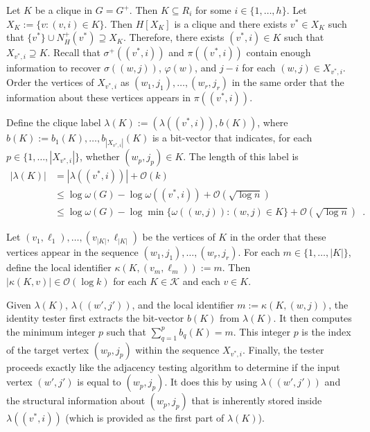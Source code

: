\documentclass{patmorin}
\renewcommand{\le}{\leqslant}
\newcommand{\Oh}{\mathcal{O}}
\begin{document}
  Let $K$ be a clique in $G=G^+$.  Then $K\subseteq R_i$ for some $i\in\{1,\ldots,h\}$.  Let $X_K:=\{v: (v,i)\in K\}$.
  Then $H[X_K]$ is a clique and there exists $v^*\in X_K$ such that $\{v^*\}\cup N^+_H(v^*)\supseteq X_K$.
  Therefore, there exists $(v^*,i)\in K$ such that $X_{v^*,i}\supseteq K$. Recall that $\sigma^+((v^*,i))$ and $\pi((v^*,i))$ contain enough information to recover $\sigma((w,j))$, $\varphi(w)$, and $j-i$ for each $(w,j)\in X_{v^*,i}$.
  Order the vertices of $X_{v^*,i}$ as $(w_1,j_1),\ldots,(w_{r},j_r)$ in the same order that the information about these vertices appears in $\pi((v^*,i))$.

  Define the clique label $\lambda(K):=(\lambda((v^*,i)), b(K))$, where $b(K):=b_1(K),\ldots,b_{|X_{v^*,i}|}(K)$ is a bit-vector that indicates, for each $p\in\{1,\ldots,|X_{v^*,i}|\}$, whether $(w_p,j_p)\in K$.
  The length of this label is
  \begin{align*}
     |\lambda(K)|
     & = |\lambda((v^*,i))| + \Oh(k) \\
     & \le \log\omega(G) - \log\omega((v^*,i)) + \Oh(\sqrt{\log n}) \\
     & \le \log\omega(G) - \log\min\{\omega((w,j)):(w,j)\in K\} + \Oh(\sqrt{\log n})  \enspace .
  \end{align*}

  Let $(v_1,\ell_1),\ldots,(v_{|K|},\ell_{|K|})$ be the vertices of $K$ in the order that these vertices appear in the sequence $(w_1,j_1),\ldots,(w_{r},j_r)$.
  For each $m\in\{1,\ldots,|K|\}$, define the local identifier $\kappa(K,(v_m,\ell_m)):= m$.  Then $|\kappa(K,v)|\in \Oh(\log k)$ for each $K\in\mathcal{K}$ and each $v\in K$.

  Given $\lambda(K)$, $\lambda((w',j'))$, and the local identifier $m := \kappa(K,(w,j))$, the identity tester first extracts the bit-vector $b(K)$ from $\lambda(K)$.
  It then computes the minimum integer $p$ such that $\sum_{q=1}^p b_q(K)=m$.
  This integer $p$ is the index of the target vertex $(w_p, j_p)$ within the sequence $X_{v^*,i}$.
  Finally, the tester proceeds exactly like the adjacency testing algorithm to determine if the input vertex $(w',j')$ is equal to $(w_p,j_p)$. It does this by using $\lambda((w',j'))$ and the structural information about $(w_p,j_p)$ that is inherently stored inside $\lambda((v^*,i))$ (which is provided as the first part of $\lambda(K)$).
\end{document}
